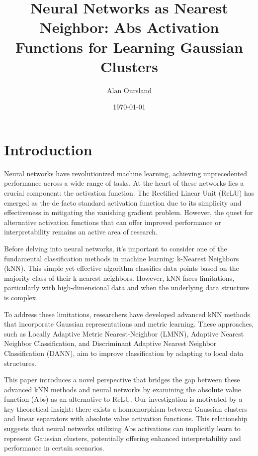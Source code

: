 \documentclass[11pt]{article}
\title{Neural Networks as Nearest Neighbor: Abs Activation Functions for Learning Gaussian Clusters}
\author{Alan Oursland}
\date{\today}
\begin{document}
\maketitle

\begin{abstract}
\end{abstract}

\section{Introduction}
Neural networks have revolutionized machine learning, achieving unprecedented performance across a 
wide range of tasks. At the heart of these networks lies a crucial component: the activation 
function. The Rectified Linear Unit (ReLU) has emerged as the de facto standard activation 
function due to its simplicity and effectiveness in mitigating the vanishing gradient problem. 
However, the quest for alternative activation functions that can offer improved performance or 
interpretability remains an active area of research.

Before delving into neural networks, it's important to consider one of the fundamental classification methods in machine learning: k-Nearest Neighbors (kNN). This simple yet effective algorithm classifies data points based on the majority class of their k nearest neighbors. However, kNN faces limitations, particularly with high-dimensional data and when the underlying data structure is complex.

To address these limitations, researchers have developed advanced kNN methods that incorporate Gaussian representations and metric learning. These approaches, such as Locally Adaptive Metric Nearest-Neighbor (LMNN), Adaptive Nearest Neighbor Classification, and Discriminant Adaptive Nearest Neighbor Classification (DANN), aim to improve classification by adapting to local data structures.

This paper introduces a novel perspective that bridges the gap between these advanced kNN methods and neural networks by examining the absolute value function (Abs) as an alternative to ReLU. Our investigation is motivated by a key theoretical insight: there exists a homomorphism between Gaussian clusters and linear separators with absolute value activation functions. This relationship suggests that neural networks utilizing Abs activations can implicitly learn to represent Gaussian clusters, potentially offering enhanced interpretability and performance in certain scenarios.
\end{document}
